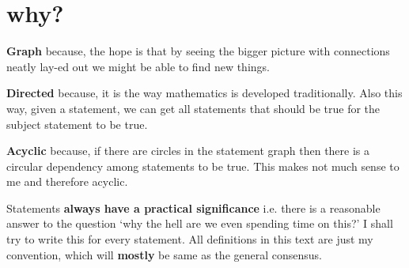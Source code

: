\documentclass[./main.tex]{subfiles}
\begin{document}
\section{why?}
\textbf{Graph} because, the hope is that by seeing the bigger picture with connections neatly lay-ed out we might be able to find new things.

\textbf{Directed} because, it is the way mathematics is developed traditionally. Also this way, given a statement, we can get all statements that should be true for the subject statement to be true.

\textbf{Acyclic} because, if there are circles in the statement graph then there is a circular dependency among statements to be true.
This makes not much sense to me and therefore acyclic.

Statements \textbf{always have a practical significance} i.e. there is a reasonable answer to the question `why the hell are we even spending time on this?' I shall try to write this for every statement. All definitions in this text are just my convention, which will \textbf{mostly} be same as the general consensus.
\end{document}
